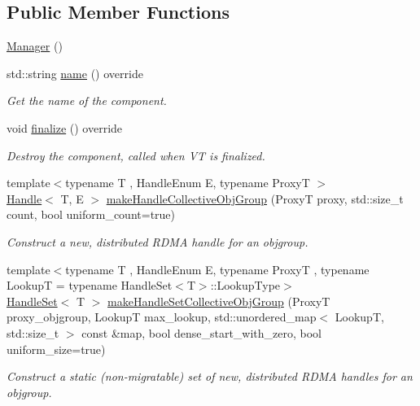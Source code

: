 \subsection*{Public Member Functions}
\begin{DoxyCompactItemize}
\item 
\hyperlink{structvt_1_1rdma_1_1_manager_aa5d34a3c5fa988278255562eea5f8aca}{Manager} ()
\item 
std\+::string \hyperlink{structvt_1_1rdma_1_1_manager_aa649646fe571ac8100a39737ac413a8d}{name} () override
\begin{DoxyCompactList}\small\item\em Get the name of the component. \end{DoxyCompactList}\item 
void \hyperlink{structvt_1_1rdma_1_1_manager_ad4ff20cf1ba6e870326b20900e6eb581}{finalize} () override
\begin{DoxyCompactList}\small\item\em Destroy the component, called when VT is finalized. \end{DoxyCompactList}\item 
{\footnotesize template$<$typename T , Handle\+Enum E, typename ProxyT $>$ }\\\hyperlink{structvt_1_1rdma_1_1_handle}{Handle}$<$ T, E $>$ \hyperlink{structvt_1_1rdma_1_1_manager_a1aea03b0c098e22cedc08159a64dbd7c}{make\+Handle\+Collective\+Obj\+Group} (ProxyT proxy, std\+::size\+\_\+t count, bool uniform\+\_\+count=true)
\begin{DoxyCompactList}\small\item\em Construct a new, distributed R\+D\+MA handle for an objgroup. \end{DoxyCompactList}\item 
{\footnotesize template$<$typename T , Handle\+Enum E, typename ProxyT , typename LookupT  = typename Handle\+Set$<$\+T$>$\+::\+Lookup\+Type$>$ }\\\hyperlink{structvt_1_1rdma_1_1_handle_set}{Handle\+Set}$<$ T $>$ \hyperlink{structvt_1_1rdma_1_1_manager_aa86a5f0d86cd0e721f863a68fbe66a35}{make\+Handle\+Set\+Collective\+Obj\+Group} (ProxyT proxy\+\_\+objgroup, LookupT max\+\_\+lookup, std\+::unordered\+\_\+map$<$ LookupT, std\+::size\+\_\+t $>$ const \&map, bool dense\+\_\+start\+\_\+with\+\_\+zero, bool uniform\+\_\+size=true)
\begin{DoxyCompactList}\small\item\em Construct a static (non-\/migratable) set of new, distributed R\+D\+MA handles for an objgroup. \end{DoxyCompactList}\item 

\end{DoxyCompactItemize}
